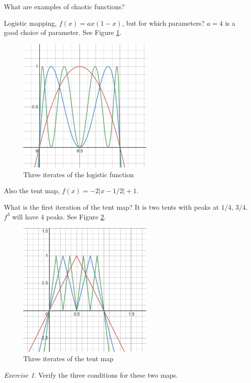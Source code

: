 \documentclass{article}
\theoremstyle{remark}
\newtheorem{exercise}{Exercise}
\begin{document}
What are examples of chaotic functions?

Logistic mapping, $f(x) = ax(1-x)$, but for which parameters?
$a = 4$ is a good choice of parameter. See Figure 
\ref{fig:logistic}.
\begin{figure}
    \centering
    \includegraphics[width=0.6\textwidth]{desmos-graph-logistic.png}
    \caption{Three iterates of the logistic function}
    \label{fig:logistic}
\end{figure}

Also the tent map, $f(x) = -2|x-1/2| + 1$.

What is the first iteration of the tent map? It is two tents
with peaks at $1/4$, $3/4$.
$f^3$ will have $4$ peaks. See Figure 
\ref{fig:tent}.
\begin{figure}
    \centering
    \includegraphics[width=0.6\textwidth]{desmos-graph.png}
    \caption{Three iterates of the tent map}
    \label{fig:tent}
\end{figure}

\begin{exercise}
    Verify the three conditions for these two maps.
\end{exercise}
\end{document}

